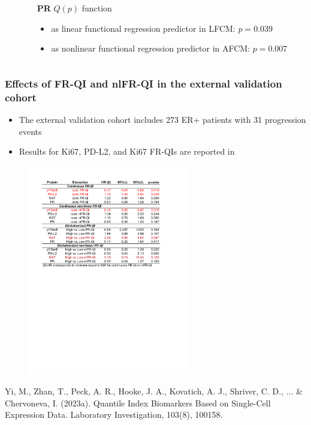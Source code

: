 \documentclass[t,8pt]{beamer}
\begin{document}
{\begin{columns}[T]
\begin{column}{0.6\textwidth}
		\end{column}	
		\begin{column}{0.3\textwidth}
		 \color{red}  \textbf{PR}   \color{black} $Q(p)$ function\\
		\begin{itemize}
	             \item as linear functional regression
	             predictor in LFCM: $p=0.039$
		        \item  as nonlinear functional regression
			predictor in AFCM: $p=0.007$
             \end{itemize}  
		\end{column}
	\end{columns}		
	      
}

\frame
   {\frametitle{Effects of FR-QI and nlFR-QI in the external validation cohort}  
      \begin{itemize}
        \item The external validation cohort includes 273 ER+ patients with 31 progression events
        \item Results for Ki67, PD-L2, and Ki67 FR-QIs are reported in \cite{Yi23}
          \end{itemize}
		\begin{figure}
                \includegraphics[width=2.8in] {Figures/Tables.pdf}
		\end{figure} 
\begin{thebibliography}{ }
\begin{footnotesize}
Yi, M., Zhan, T., Peck, A. R., Hooke, J. A., Kovatich, A. J., Shriver, C. D., ... & Chervoneva, I. (2023a). Quantile Index Biomarkers Based on Single-Cell Expression Data. Laboratory Investigation, 103(8), 100158.
\end{footnotesize}
\end{thebibliography}
}
\end{document}
